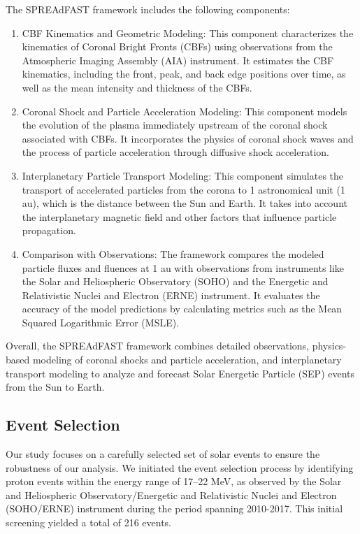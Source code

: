 The SPREAdFAST framework includes the following components:
\begin{enumerate}
    \item CBF Kinematics and Geometric Modeling: This component characterizes the kinematics of Coronal Bright Fronts (CBFs) using observations from the Atmospheric Imaging Assembly (AIA) instrument. It estimates the CBF kinematics, including the front, peak, and back edge positions over time, as well as the mean intensity and thickness of the CBFs.
    \item Coronal Shock and Particle Acceleration Modeling: This component models the evolution of the plasma immediately upstream of the coronal shock associated with CBFs. It incorporates the physics of coronal shock waves and the process of particle acceleration through diffusive shock acceleration.
    \item Interplanetary Particle Transport Modeling: This component simulates the transport of accelerated particles from the corona to 1 astronomical unit (1 au), which is the distance between the Sun and Earth. It takes into account the interplanetary magnetic field and other factors that influence particle propagation.
    \item Comparison with Observations: The framework compares the modeled particle fluxes and fluences at 1 au with observations from instruments like the Solar and Heliospheric Observatory (SOHO) and the Energetic and Relativistic Nuclei and Electron (ERNE) instrument. It evaluates the accuracy of the model predictions by calculating metrics such as the Mean Squared Logarithmic Error (MSLE).
\end{enumerate}
Overall, the SPREAdFAST framework combines detailed observations, physics-based modeling of coronal shocks and particle acceleration, and interplanetary transport modeling to analyze and forecast Solar Energetic Particle (SEP) events from the Sun to Earth.

\subsection{Event Selection}
Our study focuses on a carefully selected set of solar events to ensure the robustness of our analysis. We initiated the event selection process by identifying proton events within the energy range of 17–22 MeV, as observed by the Solar and Heliospheric Observatory/Energetic and Relativistic Nuclei and Electron (SOHO/ERNE) instrument during the period spanning 2010-2017. This initial screening yielded a total of 216 events.


